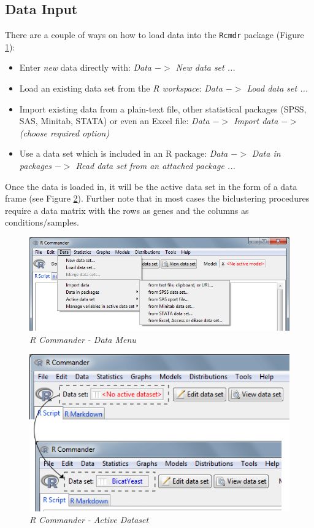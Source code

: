 \documentclass[a4paper]{article}\usepackage[]{graphicx}\usepackage[]{color}
\begin{document}
\subsection{Data Input}
There are a couple of ways on how to load data into the \verb|Rcmdr| package
(Figure \ref{datainput}):
\begin{itemize}
  \item Enter {\it new} data directly with: {\it Data $->$ New data set ...}
  \item Load an existing data set from the {\it R workspace}: {\it Data $->$ Load data set ...}
  \item Import existing data from a plain-text file, other statistical packages
  (SPSS, SAS, Minitab, STATA) or even an Excel file: {\it Data $->$ Import data $->$ (choose required option)}
  \item Use a data set which is included in an R package: {\it Data $->$ Data in
  packages $->$ Read data set from an attached package ...}
\end{itemize}
\noindent Once the data is loaded in, it will be the active data set in the form
of a data frame (see Figure \ref{activedataset}). Further note that in most
cases the biclustering procedures require a data matrix with the rows as genes and the columns as conditions/samples.
\begin{figure}[H]
\centering
\includegraphics[scale=0.5]{figures/rcmdr_datainput.png}
\caption{{\it R Commander - Data Menu}\label{datainput}}
\end{figure}
\begin{figure}[H]
\centering
\includegraphics[scale=0.5]{figures/rcmdr_activedataset.png}
\caption{{\it R Commander - Active Dataset}\label{activedataset}}
\end{figure}
\end{document}
